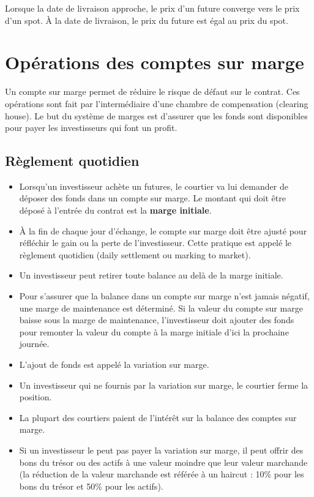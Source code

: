 Lorsque la date de livraison approche, le prix d'un future converge vers le prix d'un spot. À la date de livraison, le prix du future est égal au prix du spot. 

\section{Opérations des comptes sur marge}

Un compte sur marge permet de réduire le risque de défaut sur le contrat. Ces opérations sont fait par l'intermédiaire d'une chambre de compensation (clearing house). Le but du système de marges est d'assurer que les fonds sont disponibles pour payer les investisseurs qui font un profit. 

\subsection{Règlement quotidien}

\begin{itemize}
	\item Lorsqu'un investisseur achète un futures, le courtier va lui demander de déposer des fonds dans un compte sur marge. Le montant qui doit être déposé à l'entrée du contrat est la \textbf{marge initiale}. 
	\item À la fin de chaque jour d'échange, le compte sur marge doit être ajusté pour réfléchir le gain ou la perte de l'investisseur. Cette pratique est appelé le règlement quotidien (daily settlement ou marking to market). 
	\item Un investisseur peut retirer toute balance au delà de la marge initiale. 
	\item Pour s'assurer que la balance dans un compte sur marge n'est jamais négatif, une marge de maintenance est déterminé. Si la valeur du compte sur marge baisse sous la marge de maintenance, l'investisseur doit ajouter des fonds pour remonter la valeur du compte à la marge initiale d'ici la prochaine journée.
	\item L'ajout de fonds est appelé la variation sur marge. 
	\item Un investisseur qui ne fournis par la variation sur marge, le courtier ferme la position. 
	\item La plupart des courtiers paient de l'intérêt sur la balance des comptes sur marge. 
	\item Si un investisseur le peut pas payer la variation sur marge, il peut offrir des bons du trésor ou des actifs à une valeur moindre que leur valeur marchande (la réduction de la valeur marchande est référée à un haircut : 10\% pour les bons du trésor et 50\% pour les actifs).  
\end{itemize}

